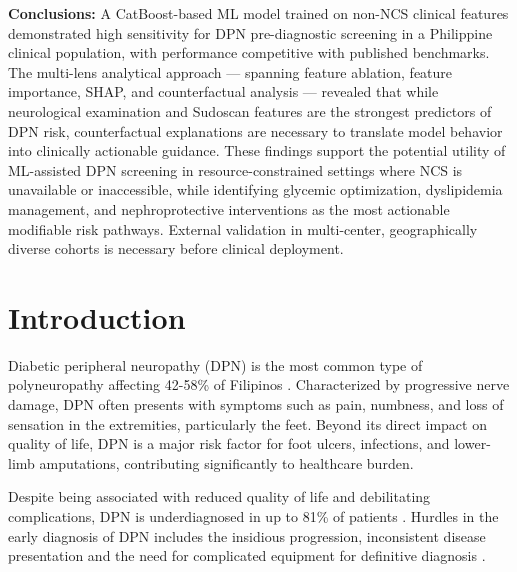 \documentclass[pdflatex,sn-vancouver-num]{sn-jnl}
\begin{document}
{\textbf{Conclusions:} A CatBoost-based ML model trained on non-NCS clinical features demonstrated high sensitivity for DPN pre-diagnostic screening in a Philippine clinical population, with performance competitive with published benchmarks. The multi-lens analytical approach --- spanning feature ablation, feature importance, SHAP, and counterfactual analysis --- revealed that while neurological examination and Sudoscan features are the strongest predictors of DPN risk, counterfactual explanations are necessary to translate model behavior into clinically actionable guidance. These findings support the potential utility of ML-assisted DPN screening in resource-constrained settings where NCS is unavailable or inaccessible, while identifying glycemic optimization, dyslipidemia management, and nephroprotective interventions as the most actionable modifiable risk pathways. External validation in multi-center, geographically diverse cohorts is necessary before clinical deployment.}


\maketitle

\section{Introduction}
Diabetic peripheral neuropathy (DPN) is the most common type of polyneuropathy affecting 42-58\% of Filipinos \cite{ropper2019adams, araneta2006hyperglycemia, dagang2016validation}.
Characterized by progressive nerve damage, DPN often presents with symptoms such as pain, numbness, and loss of sensation in the extremities, particularly the feet. Beyond its direct impact on quality of life, DPN is a major risk factor for foot ulcers, infections, and lower-limb amputations, contributing significantly to healthcare burden.

Despite being associated with reduced quality of life and debilitating complications,
DPN is underdiagnosed in up to 81\% of patients \cite{vinik2012neuropathy, ziegler2018painful}. Hurdles in the early diagnosis of DPN includes the insidious progression, inconsistent disease presentation and the need for complicated equipment for definitive diagnosis \cite{vinik2012neuropathy, ziegler2018painful, casellini2013sudoscan}.
\end{document}
